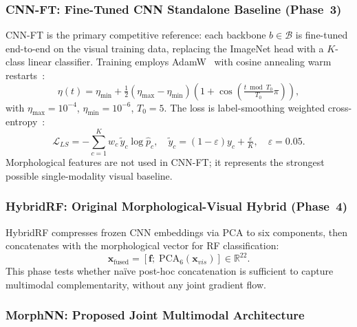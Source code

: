 \documentclass[preprint,12pt]{elsarticle}
\begin{document}
\subsubsection{CNN-FT: Fine-Tuned CNN Standalone Baseline (Phase~3)}
\label{sec:phase3}

CNN-FT is the primary competitive reference: each backbone $b \in \mathcal{B}$
is fine-tuned end-to-end on the visual training data, replacing the
ImageNet head with a $K$-class linear classifier.  Training employs
AdamW~\cite{loshchilov2019adamw} with cosine annealing warm
restarts~\cite{loshchilov2017sgdr}:
\begin{equation}
  \eta(t) = \eta_{\min} +
  \tfrac{1}{2}(\eta_{\max} - \eta_{\min})
  \left(1 + \cos\!\left(\tfrac{t\bmod T_0}{T_0}\pi\right)\right),
  \label{eq:cosine_annealing}
\end{equation}
with $\eta_{\max} = 10^{-4}$, $\eta_{\min} = 10^{-6}$, $T_0 = 5$.
The loss is label-smoothing weighted cross-entropy~\cite{muller2019labelsmoothing}:
\begin{equation}
  \mathcal{L}_{LS} = -\sum_{c=1}^K w_c\,\tilde{y}_c \log\hat{p}_c,\quad
  \tilde{y}_c = (1-\varepsilon)y_c + \tfrac{\varepsilon}{K},\quad
  \varepsilon = 0.05.
  \label{eq:label_smoothing}
\end{equation}
Morphological features are not used in CNN-FT; it represents the
strongest possible single-modality visual baseline.


\subsubsection{HybridRF: Original Morphological-Visual Hybrid (Phase~4)}
\label{sec:phase4}

HybridRF compresses frozen CNN embeddings via PCA to six components,
then concatenates with the morphological vector for RF classification:
\begin{equation}
  \mathbf{x}_{\mathrm{fused}} =
  \left[\mathbf{f};\;\mathrm{PCA}_6\!\left(\mathbf{x}_{vis}\right)\right]
  \in \mathbb{R}^{22}.
  \label{eq:phase4_fusion}
\end{equation}
This phase tests whether na\"ive post-hoc concatenation is sufficient
to capture multimodal complementarity, without any joint gradient flow.


\subsubsection{MorphNN: Proposed Joint Multimodal Architecture}
\label{sec:morphnn}
\end{document}
